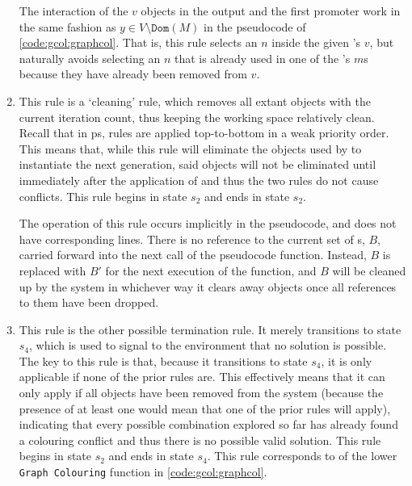 \begin{enumerate}
The interaction of the \(v\) objects in the output and the first promoter work in the same fashion as \(y \in V \setminus \texttt{Dom}(M)\) in the pseudocode of \cref{code:gcol:graphcol}.  That is, this rule selects an \(n\) inside the given \bo{}'s \(v\), but naturally avoids selecting an \(n\) that is already used in one of the \bo{}'s \(m\)s because they have already been removed from \(v\).

\item This rule is a `cleaning' rule, which removes all extant \bo{} objects with the current iteration count, thus keeping the working space relatively clean.  Recall that in \gls{ps}, rules are applied top-to-bottom in a  weak priority order.  This means that, while this rule will eliminate the \bo{} objects used by  to instantiate the next generation, said objects will not be eliminated until immediately after the application of  and thus the two rules do not cause conflicts.  This rule begins in state \(s_2\) and ends in state \(s_2\).

The operation of this rule occurs implicitly in the pseudocode, and does not have corresponding lines.  There is no reference to the current set of \bo{}s, \(B\), carried forward into the next call of the pseudocode function.  Instead, \(B\) is replaced with \(B'\) for the next execution of the function, and \(B\) will be cleaned up by the system in whichever way it clears away objects once all references to them have been dropped.

\item This rule is the other possible termination rule.  It merely transitions to state \(s_4\), which is used to signal to the environment that no solution is possible.  The key to this rule is that, because it transitions to state \(s_4\), it is only applicable if none of the prior rules are.  This effectively means that it can only apply if all \bo{} objects have been removed from the system (because the presence of at least one \bo{} would mean that one of the prior rules will apply), indicating that every possible combination explored so far has already found a colouring conflict and thus there is no possible valid solution.  This rule begins in state \(s_2\) and ends in state \(s_4\).  This rule corresponds to  of the lower \texttt{Graph Colouring} function in \cref{code:gcol:graphcol}.

\end{enumerate}


